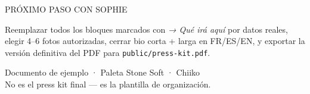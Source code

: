 \documentclass[11pt,a4paper]{article}
\begin{document}
\vspace{0.9em}
{\fSansMed\color{soft}\footnotesize\MakeUppercase{Próximo paso con Sophie}}

\vspace{0.45em}
{\small\color{ink}
Reemplazar todos los bloques marcados con \textit{\color{mute}→ Qué irá aquí} por datos reales, elegir 4--6 fotos autorizadas, cerrar bio corta + larga en FR/ES/EN, y exportar la versión definitiva del PDF para \texttt{public/press-kit.pdf}.
}

\vspace{1.6em}
{\fSans\color{mute}\footnotesize
Documento de ejemplo · Paleta Stone Soft · Chiiko\\
No es el press kit final — es la plantilla de organización.
}
\end{document}
